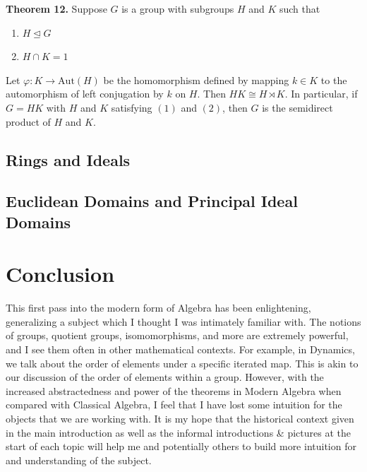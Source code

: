 \documentclass[11pt, reqno]{amsart}
\theoremstyle{plain}
\theoremstyle{definition}
\theoremstyle{example}
\def\normeq{\unlhd}
\begin{document}
\par
\textbf{Theorem 12.} Suppose $G$ is a group with subgroups $H$ and $K$ such that
\begin{enumerate}
\item $H \normeq G$
\item $H \cap K = 1$
\end{enumerate}

Let $\varphi: K \to \text{Aut}(H)$ be the homomorphism defined by mapping $k \in K$ to the automorphism of left conjugation by $k$ on $H$. Then $HK \cong H \rtimes K$. In particular, if $G = HK$ with $H$ and $K$ satisfying $(1)$ and $(2)$, then $G$ is the semidirect product of $H$ and $K$.

\subsection{Rings and Ideals}


\subsection{Euclidean Domains and Principal Ideal Domains}

\section{Conclusion}

\par
This first pass into the modern form of Algebra has been enlightening, generalizing a subject which I thought I was intimately familiar with. The notions of groups, quotient groups, isomomorphisms, and more are extremely powerful, and I see them often in other mathematical contexts. For example, in Dynamics, we talk about the order of elements under a specific iterated map. This is akin to our discussion of the order of elements within a group. However, with the increased abstractedness and power of the theorems in Modern Algebra when compared with Classical Algebra, I feel that I have lost some intuition for the objects that we are working with. It is my hope that the historical context given in the main introduction as well as the informal introductions \& pictures at the start of each topic will help me and potentially others to build more intuition for and understanding of the subject.
\end{document}
